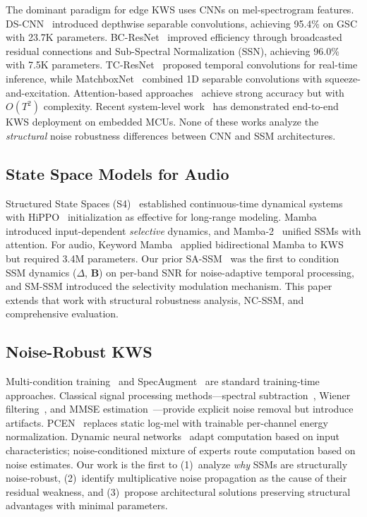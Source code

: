\documentclass[journal]{IEEEtran}
\begin{document}
The dominant paradigm for edge KWS uses CNNs on mel-spectrogram features.
DS-CNN~\cite{zhang2017hello} introduced depthwise separable convolutions, achieving 95.4\% on GSC with 23.7K parameters.
BC-ResNet~\cite{kim2021bcresnet} improved efficiency through broadcasted residual connections and Sub-Spectral Normalization (SSN), achieving 96.0\% with 7.5K parameters.
TC-ResNet~\cite{choi2019temporal} proposed temporal convolutions for real-time inference, while MatchboxNet~\cite{majumdar2020matchboxnet} combined 1D separable convolutions with squeeze-and-excitation.
Attention-based approaches~\cite{deandrade2018neural,berg2021keyword} achieve strong accuracy but with $O(T^2)$ complexity.
Recent system-level work~\cite{bartoli2025typman} has demonstrated end-to-end KWS deployment on embedded MCUs.
None of these works analyze the \emph{structural} noise robustness differences between CNN and SSM architectures.

\subsection{State Space Models for Audio}

Structured State Spaces (S4)~\cite{gu2022efficiently} established continuous-time dynamical systems with HiPPO~\cite{gu2020hippo} initialization as effective for long-range modeling.
Mamba~\cite{gu2024mamba} introduced input-dependent \emph{selective} dynamics, and Mamba-2~\cite{dao2024mamba2} unified SSMs with attention.
For audio, Keyword Mamba~\cite{goel2024keyword} applied bidirectional Mamba to KWS but required 3.4M parameters.
Our prior SA-SSM~\cite{choi2026nanomamba_interspeech} was the first to condition SSM dynamics ($\Delta$, $\mathbf{B}$) on per-band SNR for noise-adaptive temporal processing, and SM-SSM introduced the selectivity modulation mechanism.
This paper extends that work with structural robustness analysis, NC-SSM, and comprehensive evaluation.

\subsection{Noise-Robust KWS}

Multi-condition training~\cite{ko2015audio} and SpecAugment~\cite{park2019specaugment} are standard training-time approaches.
Classical signal processing methods---spectral subtraction~\cite{boll1979suppression}, Wiener filtering~\cite{haykin2014adaptive}, and MMSE estimation~\cite{ephraim1984speech}---provide explicit noise removal but introduce artifacts.
PCEN~\cite{wang2017trainable} replaces static log-mel with trainable per-channel energy normalization.
Dynamic neural networks~\cite{han2021dynamic} adapt computation based on input characteristics; noise-conditioned mixture of experts route computation based on noise estimates.
Our work is the first to (1)~analyze \emph{why} SSMs are structurally noise-robust, (2)~identify multiplicative noise propagation as the cause of their residual weakness, and (3)~propose architectural solutions preserving structural advantages with minimal parameters.
\end{document}
